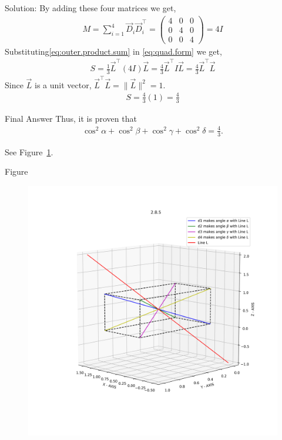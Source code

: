\documentclass{beamer}
\begin{document}
\begin{frame}{Solution: }
\noindent
By adding these four matrices we get,
\begin{align}
    M = \sum_{i=1}^{4} \vec{D}_i \vec{D}_i^\top = \begin{pmatrix} 4&0&0\\0&4&0\\0&0&4 \end{pmatrix} = 4I
    \label{eq:outer.product.sum}
\end{align}
Substituting\eqref{eq:outer.product.sum} in \eqref{eq:quad.form} we get,
\begin{align}
    S = \frac{1}{3} \vec{L}^\top (4I) \vec{L} = \frac{4}{3} \vec{L}^\top I \vec{L} = \frac{4}{3} \vec{L}^\top \vec{L}
\end{align}
Since $\vec{L}$ is a unit vector, $\vec{L}^\top \vec{L} = \|\vec{L}\|^2 = 1$.
\begin{align}
    S = \frac{4}{3}(1) = \frac{4}{3}
\end{align}

\end{frame}

\begin{frame}{Final Answer}
\noindent
Thus, it is proven that 
\begin{align*}
\cos^2\alpha + \cos^2\beta + \cos^2\gamma + \cos^2\delta = \frac{4}{3}.
\end{align*}

See Figure~\ref{fig:3DVectors}.   
\end{frame}

\begin{frame}{Figure}
    \begin{figure}[h!]
    \centering
    \includegraphics[width=0.7\linewidth]{figs/fig.png}
    \caption{}
    \label{fig:3DVectors}
\end{figure}
\end{frame}
\end{document}
